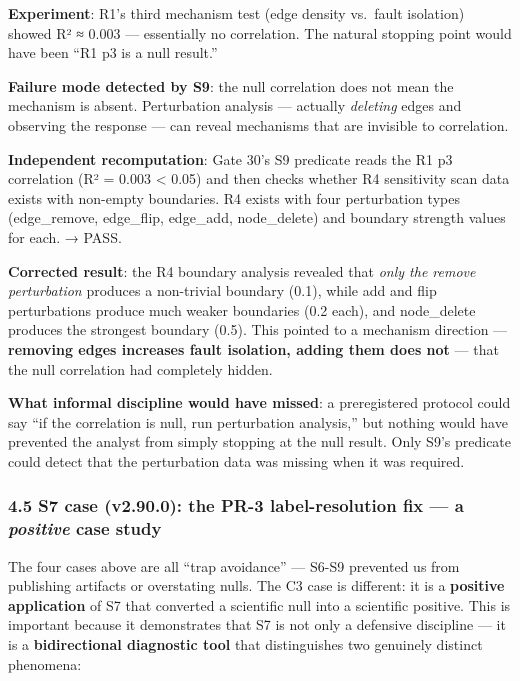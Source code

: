 \documentclass[
]{article}
\begin{document}
\textbf{Experiment}: R1's third mechanism test (edge density vs.~fault
isolation) showed R² ≈ 0.003 --- essentially no correlation. The natural
stopping point would have been ``R1 p3 is a null result.''

\textbf{Failure mode detected by S9}: the null correlation does not mean
the mechanism is absent. Perturbation analysis --- actually
\emph{deleting} edges and observing the response --- can reveal
mechanisms that are invisible to correlation.

\textbf{Independent recomputation}: Gate 30's S9 predicate reads the R1
p3 correlation (R² = 0.003 \textless{} 0.05) and then checks whether R4
sensitivity scan data exists with non-empty boundaries. R4 exists with
four perturbation types (edge\_remove, edge\_flip, edge\_add,
node\_delete) and boundary strength values for each. → PASS.

\textbf{Corrected result}: the R4 boundary analysis revealed that
\emph{only the remove perturbation} produces a non-trivial boundary
(0.1), while add and flip perturbations produce much weaker boundaries
(0.2 each), and node\_delete produces the strongest boundary (0.5). This
pointed to a mechanism direction --- \textbf{removing edges increases
fault isolation, adding them does not} --- that the null correlation had
completely hidden.

\textbf{What informal discipline would have missed}: a preregistered
protocol could say ``if the correlation is null, run perturbation
analysis,'' but nothing would have prevented the analyst from simply
stopping at the null result. Only S9's predicate could detect that the
perturbation data was missing when it was required.

\subsubsection{\texorpdfstring{4.5 S7 case (v2.90.0): the PR-3
label-resolution fix --- a \emph{positive} case
study}{4.5 S7 case (v2.90.0): the PR-3 label-resolution fix --- a positive case study}}\label{s7-case-v2.90.0-the-pr-3-label-resolution-fix-a-positive-case-study}

The four cases above are all ``trap avoidance'' --- S6-S9 prevented us
from publishing artifacts or overstating nulls. The C3 case is
different: it is a \textbf{positive application} of S7 that converted a
scientific null into a scientific positive. This is important because it
demonstrates that S7 is not only a defensive discipline --- it is a
\textbf{bidirectional diagnostic tool} that distinguishes two genuinely
distinct phenomena:
\end{document}
